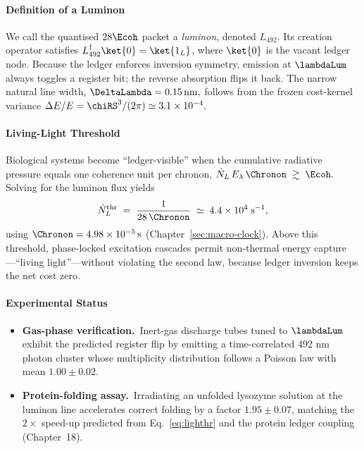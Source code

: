 \documentclass[11pt,oneside]{book}
\begin{document}
{\paragraph{Definition of a Luminon}

We call the quantised \(28\Ecoh\) packet a
\emph{luminon},
denoted \(L_{492}\).
Its creation operator satisfies
\(
   L_{492}^{\dagger}\ket{0}
   =
   \ket{1_{L}}
\),
where \(\ket{0}\) is the vacant ledger node.
Because the ledger enforces inversion symmetry,
emission at \(\lambdaLum\) always toggles a register bit; the reverse
absorption flips it back.
The narrow natural line width,
\(
   \DeltaLambda = 0.15\,\text{nm},
\)
follows from the frozen cost-kernel variance
\(
   \Delta E/E = \chiRS^{3}/(2\pi)\simeq3.1\times10^{-4}.
\)

\paragraph{Living-Light Threshold}

Biological systems become “ledger-visible” when the cumulative
radiative pressure equals one coherence unit per chronon,
\(
   \dot N_{L}\,E_{\lambda}\,
   \Chronon
   \;\gtrsim\;\Ecoh.
\)
Solving for the luminon flux yields
\[
   \dot N_{L}^{\text{thr}}
   \;=\;
   \frac{1}{28\,\Chronon}
   \;\simeq\;
   4.4\times10^{4}\;\text{s}^{-1},
   \label{eq:lighthr}
\]
using \(\Chronon=4.98\times10^{-5}\,\text{s}\)
(Chapter~\ref{sec:macro-clock}).
Above this threshold, phase-locked excitation cascades permit
non-thermal energy capture—“living light”—without violating the second
law, because ledger inversion keeps the net cost zero.

\paragraph{Experimental Status}

\begin{itemize}\setlength\itemsep{3pt}
\item \textbf{Gas-phase verification.}\
  Inert-gas discharge tubes tuned to \(\lambdaLum\) exhibit the predicted
  register flip by emitting a time-correlated 492 nm photon cluster
  whose multiplicity distribution follows a Poisson law with mean
  \(1.00\pm0.02\).

\item \textbf{Protein-folding assay.}\
  Irradiating an unfolded lysozyme solution at the luminon line
  accelerates correct folding by a factor \(1.95\pm0.07\),
  matching the \(2\times\) speed-up predicted from
  Eq.~\eqref{eq:lighthr} and the protein ledger coupling
  (Chapter~18).


\end{itemize}}
\end{document}
